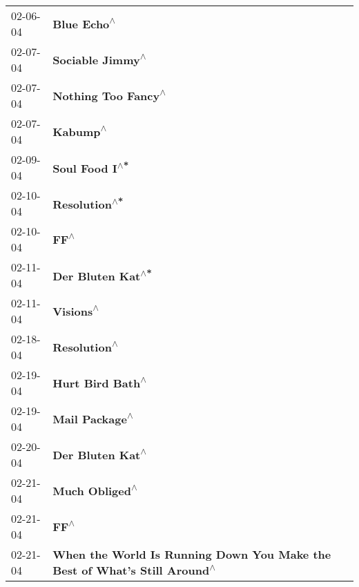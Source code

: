 \begin{supertabular}{p{0.25\columnwidth}p{0.75\columnwidth}}
 02-06-04 &                                                                \textbf{Blue Echo\textsuperscript{$\wedge$}} \\
 02-07-04 &                                                           \textbf{Sociable Jimmy\textsuperscript{$\wedge$}} \\
 02-07-04 &                                                        \textbf{Nothing Too Fancy\textsuperscript{$\wedge$}} \\
 02-07-04 &                                                                   \textbf{Kabump\textsuperscript{$\wedge$}} \\
 02-09-04 &                                                             \textbf{Soul Food I\textsuperscript{$\wedge$*}} \\
 02-10-04 &                                                              \textbf{Resolution\textsuperscript{$\wedge$*}} \\
 02-10-04 &                                                                       \textbf{FF\textsuperscript{$\wedge$}} \\
 02-11-04 &                                                          \textbf{Der Bluten Kat\textsuperscript{$\wedge$*}} \\
 02-11-04 &                                                                  \textbf{Visions\textsuperscript{$\wedge$}} \\
 02-18-04 &                                                               \textbf{Resolution\textsuperscript{$\wedge$}} \\
 02-19-04 &                                                           \textbf{Hurt Bird Bath\textsuperscript{$\wedge$}} \\
 02-19-04 &                                                             \textbf{Mail Package\textsuperscript{$\wedge$}} \\
 02-20-04 &                                                           \textbf{Der Bluten Kat\textsuperscript{$\wedge$}} \\
 02-21-04 &                                                             \textbf{Much Obliged\textsuperscript{$\wedge$}} \\
 02-21-04 &                                                                       \textbf{FF\textsuperscript{$\wedge$}} \\
 02-21-04 &  \textbf{When the World Is Running Down You Make the Best of What's Still Around\textsuperscript{$\wedge$}} \\

\end{supertabular}
